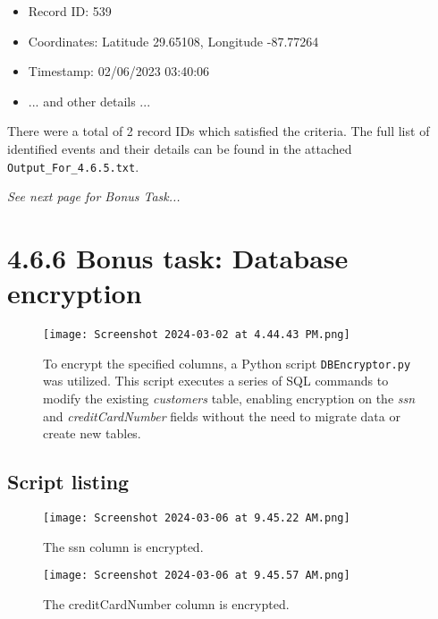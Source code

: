 \documentclass{article}
\begin{document}
\begin{itemize}
    \item Record ID: 539
    \item Coordinates: Latitude 29.65108, Longitude -87.77264
    \item Timestamp: 02/06/2023 03:40:06
    \item ... and other details ...
\end{itemize}

There were a total of 2 record IDs which satisfied the criteria. The full list of identified events and their details can be found in the attached \texttt{Output\_For\_4.6.5.txt}.

\vfill \textit{See next page for Bonus Task...}
\section*{4.6.6 Bonus task: Database encryption}

\begin{figure}[H]
    \centering
    \texttt{[image: Screenshot 2024-03-02 at 4.44.43 PM.png]}
    \caption{To encrypt the specified columns, a Python script \texttt{DBEncryptor.py} was utilized. This script executes a series of SQL commands to modify the existing \textit{customers} table, enabling encryption on the \textit{ssn} and \textit{creditCardNumber} fields without the need to migrate data or create new tables.}
\end{figure}

\subsection*{Script listing}


\begin{figure}[H]
    \centering
    \texttt{[image: Screenshot 2024-03-06 at 9.45.22 AM.png]}
    \caption{The ssn column is encrypted.}
\end{figure}

\begin{figure}[H]
    \centering
    \texttt{[image: Screenshot 2024-03-06 at 9.45.57 AM.png]}
    \caption{The creditCardNumber column is encrypted.}
\end{figure}

%
\end{document}
